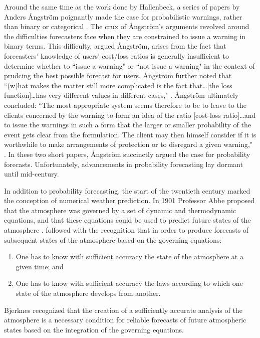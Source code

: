 Around the same time as the work done by Hallenbeck, a series of papers by Anders {{\AA}}ngstr{{\"o}}m poignantly made the case for probabilistic warnings, rather than binary or categorical \citep{Angstrom1919, Angstrom1922, Liljas1994, Murphy1998}.
The crux of {{\AA}}ngstr{{\"o}}m's arguments revolved around the difficulties forecasters face when they are constrained to issue a warning in binary terms.
This difficulty, argued {{\AA}}ngstr{{\"o}}m, arises from the fact that forecasters' knowledge of users' cost/loss ratios is generally insufficient to determine whether to ``issue a warning" or ``not issue a warning" in the context of prudcing the best possible forecast for users.
{{\AA}}ngstr{{\"o}}m further noted that ``(w)hat makes the matter still more complicated is the fact that\dots [the loss function]\dots has very different values in different cases," \citep{Angstrom1922, Murphy1998}. {{\AA}}ngstr{{\"o}}m ultimately concluded: ``The most appropriate system seems therefore to be to leave to the clients concerned by the warning to form an idea of the ratio [cost-loss ratio]\dots and to issue the warnings in such a form that the larger or smaller probability of the event gets clear from the formulation.
The client may then himself consider if it is worthwhile to make arrangements of protection or to disregard a given warning," \citep{Angstrom1922, Murphy1998}.
In these two short papers, {{\AA}}ngstr{{\"o}}m succinctly argued the case for probability forecasts.
Unfortunately, advancements in probability forecasting lay dormant until mid-century.


In addition to probability forecasting, the start of the twentieth century marked the conception of numerical weather prediction.
In 1901 Professor Abbe proposed that the atmosphere was governed by a set of dynamic and thermodynamic equations, and that these equations could be used to predict future states of the atmosphere \citep{Abbe1901}.
\cite{Bjerknes1904} followed with the recognition that in order to produce forecasts of subsequent states of the atmosphere based on the governing equations:
\begin{enumerate}
    \item One has to know with sufficient accuracy the state of the atmosphere at a given time; and
    \item One has to know with sufficient accuracy the laws according to which one state of the atmosphere develops from another.
\end{enumerate}
Bjerknes recognized that the creation of a sufficiently accurate analysis of the atmosphere is a necessary condition for reliable forecasts of future atmospheric states based on the integration of the governing equations.


